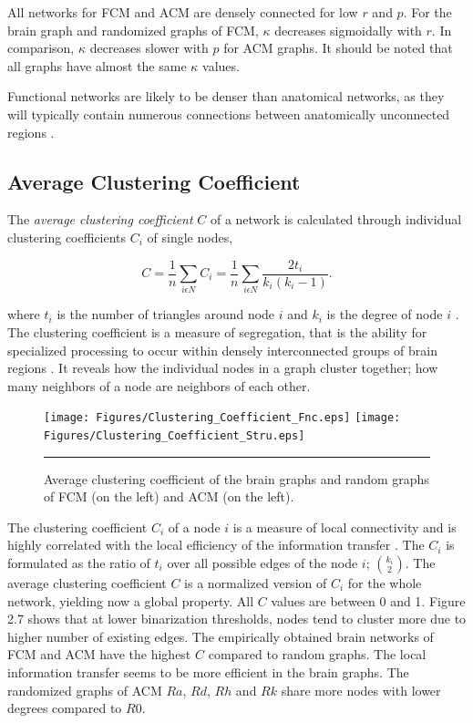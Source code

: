 All networks for FCM and ACM are densely connected for low $r$ and $p$. For the brain graph and randomized graphs of FCM, $\kappa$ decreases sigmoidally with $r$. In comparison, $\kappa$ decreases slower with $p$ for ACM graphs. It should be noted that all graphs have almost the same $\kappa$ values. 

Functional networks are likely to be denser than anatomical networks, as they will typically contain numerous connections between anatomically unconnected regions \citep{DAM09}. 

\subsection{Average Clustering Coefficient}
    
The \textit{average clustering coefficient} $C$ of a network is calculated through individual clustering coefficients $C_i$ of single nodes,

\begin{equation}
C = \frac{1}{n} \sum\limits_{i\epsilon N}C_i = \frac{1}{n}\sum\limits_{i\epsilon N} \frac{2t_i}{k_i(k_i -1)} .
\end{equation} 

where $t_i$ is the number of triangles around node $i$ and $k_i$ is the degree of node $i$ \citep{WAT98}. The clustering coefficient is a measure of segregation, that is the ability for specialized processing to occur within densely interconnected groups of brain regions \citep{RUB10}. It reveals how the individual nodes in a graph cluster together; how many neighbors of a node are neighbors of each other. 

\begin{figure}[htbp]
  \centering
	\texttt{[image: Figures/Clustering\_Coefficient\_Fnc.eps]}
	\texttt{[image: Figures/Clustering\_Coefficient\_Stru.eps]} 
    \rule{35em}{0.5pt}
    \caption[Clustering Coefficient]{Average clustering coefficient of the brain graphs and random graphs of FCM (on the left) and ACM (on the left). }
  \label{fig:Clustering Coefficient}
\end{figure}

The clustering coefficient $C_i$ of a node $i$ is a measure of local connectivity and is highly correlated with the local efficiency of the information transfer \citep{LAT01}. The $C_i$ is formulated as the ratio of $t_i$ over all possible edges of the node $i$; $\binom{k_i}{2} $. The average clustering coefficient $C$ is a normalized version of $C_i$ for the whole network, yielding now a global property. All $C$ values are between 0 and 1. Figure 2.7 shows that at lower binarization thresholds, nodes tend to cluster more due to higher number of existing edges. The empirically obtained brain networks of FCM and ACM have the highest $C$ compared to random graphs. The local information transfer seems to be more efficient in the brain graphs.  The randomized graphs of ACM $Ra$, $Rd$, $Rh$ and $Rk$ share more nodes with lower degrees compared to $R0$.

